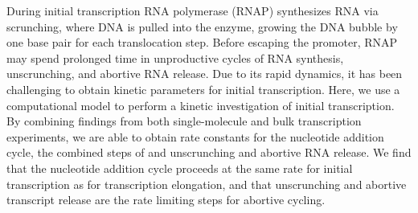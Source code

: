 During initial transcription RNA polymerase (RNAP) synthesizes RNA via
scrunching, where DNA is pulled into the enzyme, growing the DNA bubble by one
base pair for each translocation step. Before escaping the promoter, RNAP
may spend prolonged time in unproductive cycles of RNA synthesis,
unscrunching, and abortive RNA release. Due to its rapid dynamics, it has been
challenging to obtain kinetic parameters for initial transcription. Here, we
use a computational model to perform a kinetic investigation of initial
transcription. By combining findings from both single-molecule and bulk
transcription experiments, we are able to obtain rate constants for the
nucleotide addition cycle, the combined steps of and unscrunching and abortive
RNA release. We find that the nucleotide addition cycle proceeds at the same
rate for initial transcription as for transcription elongation, and that
unscrunching and abortive transcript release are the rate limiting steps
for abortive cycling.
